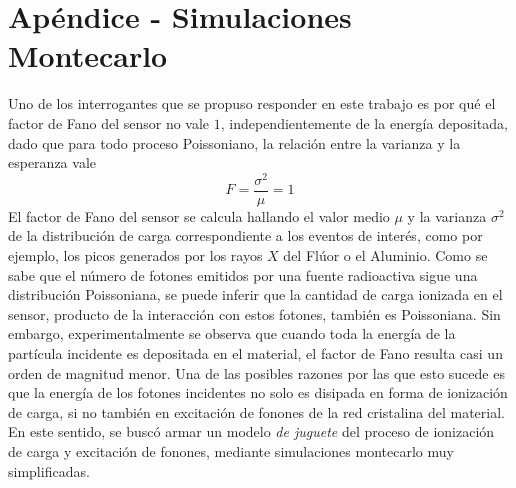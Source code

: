 \section*{Apéndice - Simulaciones Montecarlo}
\noindent Uno de los interrogantes que se propuso responder en este trabajo es por qué el factor de Fano del sensor no vale $1$, independientemente de la energía depositada, dado que para todo proceso Poissoniano, la relación entre la varianza y la esperanza vale
\begin{equation*}
    F = \frac{\sigma^{2}}{\mu} = 1
\end{equation*} 
El factor de Fano del sensor se calcula hallando el valor medio $\mu$ y la varianza $\sigma^{2}$ de la distribución de carga correspondiente a los eventos de interés, como por ejemplo, los picos generados por los rayos $X$ del Flúor o el Aluminio. Como se sabe que el número de fotones emitidos por una fuente radioactiva sigue una distribución Poissoniana, se puede inferir que la cantidad de carga ionizada en el sensor, producto de la interacción con estos fotones, también es Poissoniana. Sin embargo, experimentalmente se observa que cuando toda la energía de la partícula incidente es depositada en el material, el factor de Fano resulta casi un orden de magnitud menor\cite{TesisKevin}. Una de las posibles razones por las que esto sucede es que la energía de los fotones incidentes no solo es disipada en forma de ionización de carga, si no también en excitación de fonones de la red cristalina del material.\\
\indent En este sentido, se buscó armar un modelo \textit{de juguete} del proceso de ionización de carga y excitación de fonones, mediante simulaciones montecarlo muy simplificadas.

